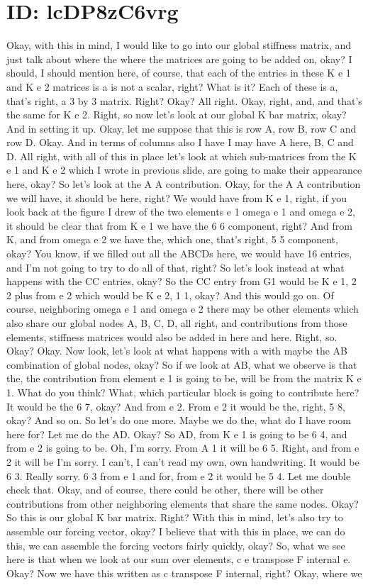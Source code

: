 \documentclass[10pt]{article}
\begin{document}
\section*{ID: lcDP8zC6vrg}
Okay, with this in mind, I would like to go into our global stiffness matrix, and just talk about where the where the matrices are going to be added on, okay? I should, I should mention here, of course, that each of the entries in these K e 1 and K e 2 matrices is a is not a scalar, right? What is it? Each of these is a, that's right, a 3 by 3 matrix. Right? Okay? All right. Okay, right, and, and that's the same for K e 2. Right, so now let's look at our global K bar matrix, okay? And in setting it up. Okay, let me suppose that this is row A, row B, row C and row D. Okay. And in terms of columns also I have I may have A here, B, C and D. All right, with all of this in place let's look at which sub-matrices from the K e 1 and K e 2 which I wrote in previous slide, are going to make their appearance here, okay? So let's look at the A A contribution. Okay, for the A A contribution we will have, it should be here, right? We would have from K e 1, right, if you look back at the figure I drew of the two elements e 1 omega e 1 and omega e 2, it should be clear that from K e 1 we have the 6 6 component, right? And from K, and from omega e 2 we have the, which one, that's right, 5 5 component, okay? You know, if we filled out all the ABCDs here, we would have 16 entries, and I'm not going to try to do all of that, right? So let's look instead at what happens with the CC entries, okay? So the CC entry from G1 would be K e 1, 2 2 plus from e 2 which would be K e 2, 1 1, okay? And this would go on. Of course, neighboring omega e 1 and omega e 2 there may be other elements which also share our global nodes A, B, C, D, all right, and contributions from those elements, stiffness matrices would also be added in here and here. Right, so. Okay? Okay. Now look, let's look at what happens with a with maybe the AB combination of global nodes, okay? So if we look at AB, what we observe is that the, the contribution from element e 1 is going to be, will be from the matrix K e 1. What do you think? What, which particular block is going to contribute here? It would be the 6 7, okay? And from e 2. From e 2 it would be the, right, 5 8, okay? And so on. So let's do one more. Maybe we do the, what do I have room here for? Let me do the AD. Okay? So AD, from K e 1 is going to be 6 4, and from e 2 is going to be. Oh, I'm sorry. From A 1 it will be 6 5. Right, and from e 2 it will be I'm sorry. I can't, I can't read my own, own handwriting. It would be 6 3. Really sorry. 6 3 from e 1 and for, from e 2 it would be 5 4. Let me double check that. Okay, and of course, there could be other, there will be other contributions from other neighboring elements that share the same nodes. Okay? So this is our global K bar matrix. Right? With this in mind, let's also try to assemble our forcing vector, okay? I believe that with this in place, we can do this, we can assemble the forcing vectors fairly quickly, okay? So, what we see here is that when we look at our sum over elements, c e transpose F internal e. Okay? Now we have this written as c transpose F internal, right? Okay, where we 
\end{document}
